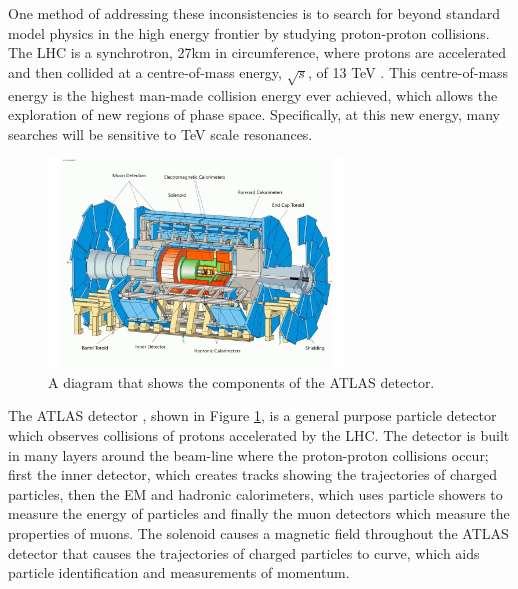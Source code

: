 \documentclass[12pt, onecolumn,notitlepage]{article}
\begin{document}
One method of addressing these inconsistencies is to search for beyond standard model physics in the high energy frontier by studying proton-proton collisions.
The LHC is a synchrotron, 27km in circumference, where protons are accelerated and then collided at a centre-of-mass energy, $\sqrt{s}$, of 13 TeV \cite{bib_LHC}.
This centre-of-mass energy is the highest man-made collision energy ever achieved, which allows the exploration of new regions of phase space. 
Specifically, at this new energy, many searches will be sensitive to TeV scale resonances.  \\

\begin{figure}[!htb]
  \begin{center}
    \includegraphics[width=0.7\textwidth]{ATLAS_Diagram.pdf}
    \caption{A diagram that shows the components of the ATLAS detector.}
    \label{ATLAS Detector}
    \end{center}
    \vspace{-0.3cm}
\end{figure}

The ATLAS detector \cite{bib_ATLAS}, shown in Figure \ref{ATLAS Detector},
is a general purpose particle detector which observes collisions of protons accelerated by the LHC. 
The detector is built in many layers around the beam-line where the proton-proton collisions occur;
first the inner detector, which creates tracks showing the trajectories of charged particles, then the EM and hadronic calorimeters, 
which uses particle showers to measure the energy of particles 
and finally the muon detectors which measure the properties of muons.
The solenoid causes a magnetic field throughout the ATLAS detector that causes the trajectories of charged particles to curve,
which aids particle identification and measurements of momentum.  \\
\end{document}

